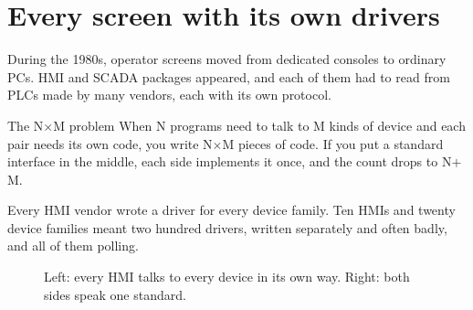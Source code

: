 \section{Every screen with its own drivers}

During the 1980s, operator screens moved from dedicated consoles to ordinary
PCs. HMI and SCADA packages appeared, and each of them had to read from PLCs
made by many vendors, each with its own protocol.

\begin{concept}{The N$\times$M problem}
When N programs need to talk to M kinds of device and each pair needs its own
code, you write N$\times$M pieces of code. If you put a standard interface in
the middle, each side implements it once, and the count drops to N$+$M.
\end{concept}

Every HMI vendor wrote a driver for every device family. Ten HMIs and twenty
device families meant two hundred drivers, written separately and often badly,
and all of them polling.

\begin{figure}[htbp]
\centering
{}
\caption{Left: every HMI talks to every device in its own way. Right: both sides
speak one standard.}
\end{figure}

